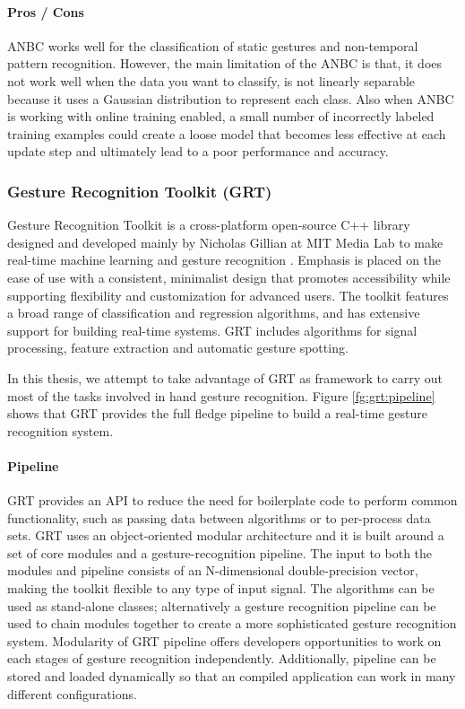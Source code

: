 \paragraph*{Pros / Cons} ANBC works well for the classification of static gestures and non-temporal pattern recognition. However, the main limitation of the ANBC is that, it does not work well when the data you want to classify, is not linearly separable because it uses a Gaussian distribution to represent each class. Also when ANBC is working with online training enabled, a small number of incorrectly labeled training examples could create a loose model that becomes less effective at each update step and ultimately lead to a poor performance and accuracy.

\subsubsection{Gesture Recognition Toolkit (GRT)} \label{sec:grt} Gesture Recognition Toolkit is a cross-platform open-source C++ library designed and developed mainly by Nicholas Gillian at MIT Media Lab to make real-time machine learning and gesture recognition \cite{16}. Emphasis is placed on the ease of use with a consistent, minimalist design that promotes accessibility while supporting flexibility and customization for advanced users. The toolkit features a broad range of classification and regression algorithms, and has extensive support for building real-time systems. GRT includes algorithms for signal processing, feature extraction and automatic gesture spotting. 

In this thesis, we attempt to take advantage of GRT as framework to carry out most of the tasks involved in hand gesture recognition. Figure \ref{fg:grt:pipeline} shows that GRT provides the full fledge pipeline to build a real-time gesture recognition system. 



\paragraph*{Pipeline} GRT provides an API to reduce the need for boilerplate code to perform common functionality, such as passing data between algorithms or to per-process data sets. GRT uses an object-oriented modular architecture and it is built around a set of core modules and a gesture-recognition pipeline. The input to both the modules and pipeline consists of an N-dimensional double-precision vector, making the toolkit flexible to any type of input signal. The algorithms can be used as stand-alone classes; alternatively a gesture recognition pipeline can be used to chain modules together to create a more sophisticated gesture recognition system. Modularity of GRT pipeline offers developers opportunities to work on each stages of gesture recognition independently. Additionally, pipeline can be stored and loaded dynamically so that an compiled application can work in many different configurations. 

